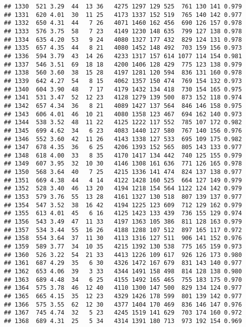 \documentclass[]{article}
\begin{document}
\begin{verbatim}
## 1330  521 3.29  44  13 36   4275 1297 129 525  761 130 141 0.979
## 1331  620 4.01  30  11 25   4173 1337 152 519  765 140 142 0.977
## 1332  650 4.31  44   7 26   4071 1460 162 456  690 126 157 0.978
## 1333  576 3.75  58   7 23   4149 1230 148 635  799 127 138 0.978
## 1334  635 4.20  53   9 24   4080 1327 177 432  829 124 131 0.978
## 1335  657 4.35  44   8 21   4080 1452 148 492  703 159 156 0.973
## 1336  594 3.79  43  14 26   4233 1317 157 614 1077 114 154 0.981
## 1337  546 3.51  69  18 18   4200 1406 128 429  775 123 138 0.979
## 1338  560 3.60  38  15 28   4197 1281 120 594  836 131 160 0.978
## 1339  642 4.27  54   8 15   4062 1357 150 474  769 154 132 0.973
## 1340  604 3.90  48   7 17   4179 1432 134 418  730 154 165 0.975
## 1341  531 3.47  52  12 23   4128 1279 139 500  873 152 118 0.974
## 1342  657 4.34  36   8 21   4089 1427 137 564  846 146 158 0.975
## 1343  606 4.01  46  10 21   4080 1358 123 467  694 162 140 0.973
## 1344  538 3.52  48  11 22   4125 1222 117 552  785 107 172 0.982
## 1345  699 4.62  34   6 23   4083 1440 127 580  767 140 156 0.976
## 1346  552 3.60  42  11 26   4143 1338 127 533  695 109 175 0.982
## 1347  678 4.35  36   6 25   4206 1393 152 565  805 143 133 0.977
## 1348  618 4.00  33   8 35   4170 1417 134 442  740 125 155 0.979
## 1349  607 3.95  32  10 30   4146 1308 161 636  771 126 165 0.978
## 1350  568 3.64  40   7 25   4215 1336 141 474  824 137 138 0.977
## 1351  669 4.38  44   4 14   4122 1428 160 525  664 127 149 0.979
## 1352  528 3.40  46  13 20   4194 1218 154 564 1122 124 142 0.979
## 1353  579 3.76  55  13 28   4161 1327 130 518  807 139 137 0.977
## 1354  547 3.52  38  16 42   4194 1225 123 609  712 129 162 0.979
## 1355  613 4.01  45   6 16   4125 1423 133 439  736 155 129 0.974
## 1356  543 3.49  47  11 33   4197 1363 105 386  811 128 163 0.979
## 1357  534 3.44  55  16 26   4188 1288 107 512  897 165 117 0.972
## 1358  554 3.64  37  11 30   4113 1316 127 511  906 141 152 0.976
## 1359  589 3.77  34  10 35   4215 1392 130 538  775 165 159 0.973
## 1360  526 3.22  54  21 33   4413 1226 109 617  926 126 173 0.980
## 1361  687 4.29  35   6 30   4326 1472 167 679  831 143 140 0.977
## 1362  653 4.06  39   3 33   4344 1491 158 498  814 128 138 0.980
## 1363  689 4.48  34   6 25   4155 1492 165 465  755 183 175 0.970
## 1364  575 3.78  46  12 40   4110 1300 147 500  829 134 124 0.977
## 1365  665 4.15  35  12 23   4329 1426 178 599  801 139 142 0.977
## 1366  575 3.55  62  12 30   4377 1404 170 469  836 146 147 0.976
## 1367  745 4.74  32   5 23   4245 1519 141 629  703 174 160 0.972
## 1368  689 4.31  25   5 34   4314 1391 180 713  973 192 154 0.969

\end{verbatim}
\end{document}
